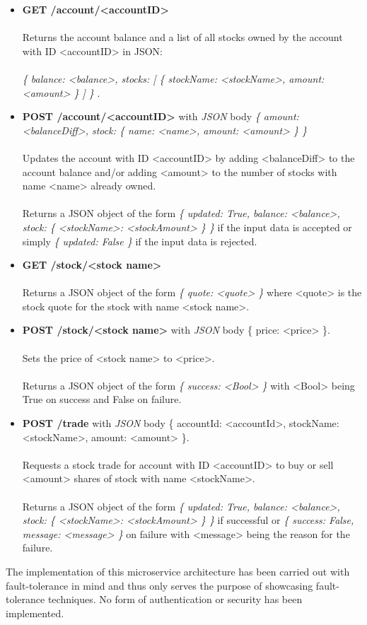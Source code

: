 \begin{itemize}
\item \textbf{GET /account/<accountID>}
  \\\\
  Returns the account balance and a list of all stocks owned by the
  account with ID <accountID> in JSON:
  \\\\
    \textit{
    \{
    balance: <balance>,
    stocks:
    [
      \{
      stockName: <stockName>,
      amount: <amount>
      \}
    ]
    \}
  }.
\item \textbf{POST /account/<accountID>} with \emph{JSON} body
  \textit{
    \{
      amount: <balanceDiff>,
      stock:
        \{
          name: <name>,
          amount: <amount>
        \}
    \}
  }
  \\\\
  Updates the account with ID <accountID> by adding <balanceDiff> to
  the account balance and/or adding <amount> to the number of stocks with
  name <name> already owned.
  \\\\
  Returns a JSON object of the form
  \textit {
    \{
      updated: True,
      balance: <balance>,
      stock:
        \{
          <stockName>: <stockAmount>
        \}
    \}
  }
  if the input data is accepted or simply
  \textit{
    \{ updated: False \}
  }
  if the input data is rejected.
\item \textbf{GET /stock/<stock name>}
  \\\\
  Returns a JSON object of the form \textit{
    \{ quote: <quote> \}
  } where <quote> is the stock quote for the stock with name <stock name>.
\item \textbf{POST /stock/<stock name>} with \emph{JSON} body \{ price:
  <price> \}.
  \\\\
  Sets the price of <stock name> to <price>.
  \\\\
  Returns a JSON object of the form \textit{
    \{ success: <Bool> \}
  } with <Bool> being True on success and False on failure.
\item \textbf{POST /trade} with \emph{JSON} body \{ accountId: <accountId>, stockName:
  <stockName>, amount: <amount> \}.
  \\\\
  Requests a stock trade for account with ID <accountID> to buy or
  sell <amount> shares of stock with name <stockName>.
  \\\\
  Returns a JSON object of the form
  \textit {
    \{
      updated: True,
      balance: <balance>,
      stock:
        \{
          <stockName>: <stockAmount>
        \}
    \}
  }
  if successful or
    \textit {
    \{
      success: False,
      message: <message>
    \}
  }
  on failure with <message> being the reason for the failure.

\end{itemize}

The implementation of this microservice architecture has been carried
out with fault-tolerance in mind and thus only serves the purpose of
showcasing fault-tolerance techniques. No form of authentication or
security has been implemented.
